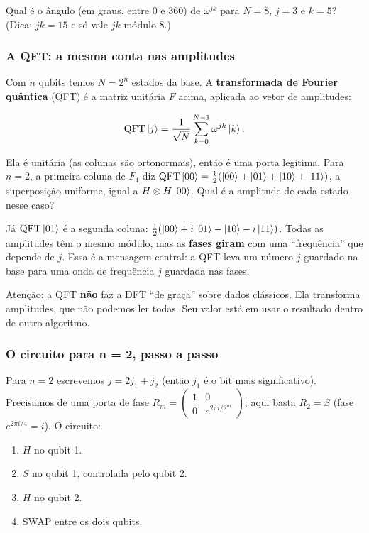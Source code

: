Qual é o ângulo (em graus, entre 0 e 360) de \(\omega^{jk}\) para \(N=8\), \(j=3\) e \(k=5\)? (Dica: \(jk=15\) e só vale \(jk\) módulo 8.)

\subsubsection{A QFT: a mesma conta nas amplitudes}\label{a-qft-a-mesma-conta-nas-amplitudes}

Com \(n\) qubits temos \(N=2^n\) estados da base. A \textbf{transformada de Fourier quântica} (QFT) é a matriz unitária \(F\) acima, aplicada ao vetor de amplitudes:

\[
\mathrm{QFT}\left|{j}\right> = \frac{1}{\sqrt N}\sum_{k=0}^{N-1} \omega^{jk}\left|{k}\right>.
\]

Ela é unitária (as colunas são ortonormais), então é uma porta legítima. Para \(n=2\), a primeira coluna de \(F_4\) diz \(\mathrm{QFT}\left|{00}\right> = \tfrac12(\left|{00}\right>+\left|{01}\right>+\left|{10}\right>+\left|{11}\right>)\), a superposição uniforme, igual a \(H\otimes H\left|{00}\right>\). Qual é a amplitude de cada estado nesse caso?

Já \(\mathrm{QFT}\left|{01}\right>\) é a segunda coluna: \(\tfrac12(\left|{00}\right>+i\left|{01}\right>-\left|{10}\right>-i\left|{11}\right>)\). Todas as amplitudes têm o mesmo módulo, mas as \textbf{fases giram} com uma ``frequência'' que depende de \(j\). Essa é a mensagem central: a QFT leva um número \(j\) guardado na base para uma onda de frequência \(j\) guardada nas fases.

Atenção: a QFT \textbf{não} faz a DFT ``de graça'' sobre dados clássicos. Ela transforma amplitudes, que não podemos ler todas. Seu valor está em usar o resultado dentro de outro algoritmo.

\subsubsection{O circuito para n = 2, passo a passo}\label{o-circuito-para-n-2-passo-a-passo}

Para \(n=2\) escrevemos \(j=2j_1+j_2\) (então \(j_1\) é o bit mais significativo). Precisamos de uma porta de fase \(R_m=\begin{pmatrix}1&0\\0&e^{2\pi i/2^m}\end{pmatrix}\); aqui basta \(R_2=S\) (fase \(e^{2\pi i/4}=i\)). O circuito:

\begin{enumerate}
\def\labelenumi{\arabic{enumi}.}
\tightlist
\item
  \(H\) no qubit 1.
\item
  \(S\) no qubit 1, controlada pelo qubit 2.
\item
  \(H\) no qubit 2.
\item
  SWAP entre os dois qubits.
\end{enumerate}

